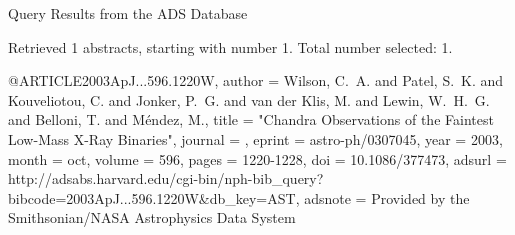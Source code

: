 Query Results from the ADS Database


Retrieved 1 abstracts, starting with number 1.  Total number selected: 1.

@ARTICLE{2003ApJ...596.1220W,
   author = {{Wilson}, C.~A. and {Patel}, S.~K. and {Kouveliotou}, C. and 
	{Jonker}, P.~G. and {van der Klis}, M. and {Lewin}, W.~H.~G. and 
	{Belloni}, T. and {M{\'e}ndez}, M.},
    title = "{Chandra Observations of the Faintest Low-Mass X-Ray Binaries}",
  journal = {\apj},
   eprint = {astro-ph/0307045},
     year = 2003,
    month = oct,
   volume = 596,
    pages = {1220-1228},
      doi = {10.1086/377473},
   adsurl = {http://adsabs.harvard.edu/cgi-bin/nph-bib_query?bibcode=2003ApJ...596.1220W&db_key=AST},
  adsnote = {Provided by the Smithsonian/NASA Astrophysics Data System}
}


